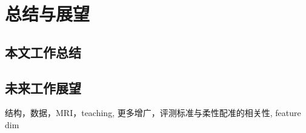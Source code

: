 
\chapter{总结与展望\label{chap:discuss}}

\section{本文工作总结}

\section{未来工作展望}
结构，数据，MRI，teaching, 更多增广，评测标准与柔性配准的相关性, feature dim



